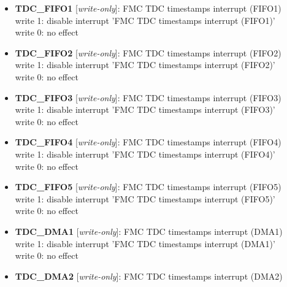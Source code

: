 \begin{itemize}
\item \begin{small}
{\bf 
TDC\_FIFO1
} [\emph{write-only}]: FMC TDC timestamps interrupt (FIFO1)
\\
write 1: disable interrupt 'FMC TDC timestamps interrupt (FIFO1)'\\write 0: no effect
\end{small}
\item \begin{small}
{\bf 
TDC\_FIFO2
} [\emph{write-only}]: FMC TDC timestamps interrupt (FIFO2)
\\
write 1: disable interrupt 'FMC TDC timestamps interrupt (FIFO2)'\\write 0: no effect
\end{small}
\item \begin{small}
{\bf 
TDC\_FIFO3
} [\emph{write-only}]: FMC TDC timestamps interrupt (FIFO3)
\\
write 1: disable interrupt 'FMC TDC timestamps interrupt (FIFO3)'\\write 0: no effect
\end{small}
\item \begin{small}
{\bf 
TDC\_FIFO4
} [\emph{write-only}]: FMC TDC timestamps interrupt (FIFO4)
\\
write 1: disable interrupt 'FMC TDC timestamps interrupt (FIFO4)'\\write 0: no effect
\end{small}
\item \begin{small}
{\bf 
TDC\_FIFO5
} [\emph{write-only}]: FMC TDC timestamps interrupt (FIFO5)
\\
write 1: disable interrupt 'FMC TDC timestamps interrupt (FIFO5)'\\write 0: no effect
\end{small}
\item \begin{small}
{\bf 
TDC\_DMA1
} [\emph{write-only}]: FMC TDC timestamps interrupt (DMA1)
\\
write 1: disable interrupt 'FMC TDC timestamps interrupt (DMA1)'\\write 0: no effect
\end{small}
\item \begin{small}
{\bf 
TDC\_DMA2
} [\emph{write-only}]: FMC TDC timestamps interrupt (DMA2)

\end{small}
\end{itemize}

